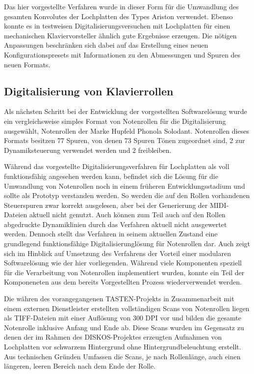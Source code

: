 Das hier vorgestellte Verfahren wurde in dieser Form für die Umwandlung des gesamten Konvolutes der Lochplatten des Types Ariston verwendet.
Ebenso konnte es in testweisen Digitalisierungsversuchen mit Lochplatten für einen mechanischen Klaviervorsteller ähnlich gute Ergebnisse erzeugen.
Die nötigen Anpassungen beschränken sich dabei auf das Erstellung eines neuen Konfigurationspresets mit Informationen zu den Abmessungen und Spuren des neuen Formats.

\subsection{Digitalisierung von Klavierrollen}

Als nächsten Schritt bei der Entwicklung der vorgestellten Softwarelösung wurde ein vergleichsweise simples Format von Notenrollen für die Digitalisierung ausgewählt, Notenrollen der Marke Hupfeld Phonola Solodant.
Notenrollen dieses Formats besitzen 77 Spuren, von denen 73 Spuren Tönen zugeordnet sind, 2 zur Dynamiksteuerung verwendet werden und 2 freibleiben.

Während das vorgestellte Digitalisierungsverfahren für Lochplatten als voll funktionsfähig angesehen werden kann, befindet sich die Lösung für die Umwandlung von Notenrollen noch in einem früheren Entwicklungsstadium und sollte als Prototyp verstanden werden.
So werden die auf den Rollen vorhandenen Steuerspuren zwar korrekt ausgelesen, aber bei der Generierung der MIDI-Dateien aktuell nicht genutzt.
Auch können zum Teil auch auf den Rollen abgedruckte Dynamiklinien durch das Verfahren aktuell nicht ausgewertet werden.
Dennoch stellt das Verfahren in seinem aktuellen Zustand eine grundlegend funktionsfähige Digitalisierunglösung für Notenrollen dar.
Auch zeigt sich im Hinblick auf Umsetzung des Verfahrens der Vorteil einer modularen Softwarelösung wie der hier vorliegenden. Während viele Komponenten speziell für die Verarbeitung von Notenrollen implementiert wurden, konnte ein Teil der Komponeneten aus dem bereits Vorgestellten Prozess wiederverwendet werden.

Die währen des vorangegangenen TASTEN-Projekts in Zusammenarbeit mit einem externen Dienstleister erstellten vollständigen Scans von Notenrollen liegen als TIFF-Dateien mit einer Auflösung von 300 DPI vor und bilden die gesamte Notenrolle inklusive Anfang und Ende ab.
Diese Scans wurden im Gegensatz zu denen der im Rahmen des DISKOS-Projektes erzeugten Aufnahmen von Lochplatten vor schwarzem Hintergrund ohne Hintergrundbeleuchtung erstellt.
Aus technischen Gründen Umfassen die Scans, je nach Rollenlänge, auch einen längeren, leeren Bereich nach dem Ende der Rolle.

